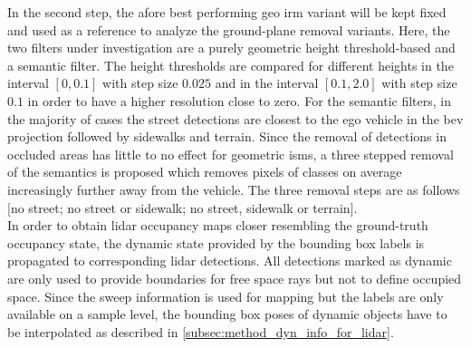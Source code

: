 In the second step, the afore best performing geo \gls{irm} variant will be kept fixed and used as a reference to analyze the ground-plane removal variants. Here, the two filters under investigation are a purely geometric height threshold-based and a semantic filter. The height thresholds are compared for different heights in the interval $[0,0.1]$ with step size $0.025$ and in the interval $[0.1,2.0]$ with step size $0.1$ in order to have a higher resolution close to zero. For the semantic filters, in the majority of cases the street detections are closest to the ego vehicle in the \gls{bev} projection followed by sidewalks and terrain. Since the removal of detections in occluded areas has little to no effect for geometric \gls{ism}s, a three stepped removal of the semantics is proposed which removes pixels of classes on average increasingly further away from the vehicle. The three removal steps are as follows $[$no street; no street or sidewalk; no street, sidewalk or terrain$]$.
\\
In order to obtain lidar occupancy maps closer resembling the ground-truth occupancy state, the dynamic state provided by the bounding box labels is propagated to corresponding lidar detections. All detections marked as dynamic are only used to provide boundaries for free space rays but not to define occupied space. Since the sweep information is used for mapping but the labels are only available on a sample level, the bounding box poses of dynamic objects have to be interpolated as described in \ref{subsec:method_dyn_info_for_lidar}. 
%
